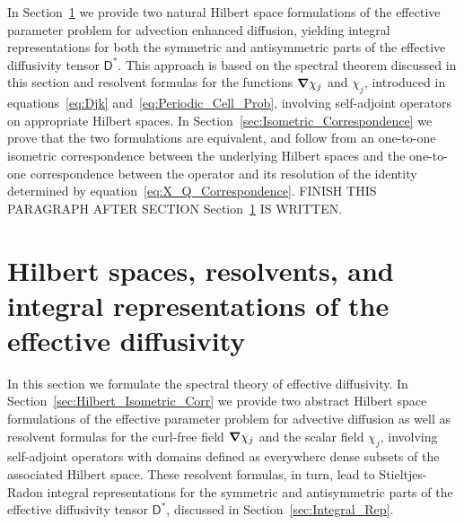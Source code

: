 \documentclass[leqno,onefignum,onetabnum]{siamltex1213}
\newcommand{\secref}[1]{Section~\ref{#1}}
\newcommand{\Dm}{\mathsf{D}}
\newcommand\bnabla{\mbox{\boldmath${\nabla}$}}
\begin{document}
In \secref{sec:Hilbert_Resolvent_Integral_Reps} we provide two natural Hilbert space
formulations of the effective parameter problem for advection enhanced
diffusion, yielding integral representations for both the symmetric and
antisymmetric parts of the effective diffusivity tensor $\Dm^*$. This
approach is based on the spectral theorem discussed in this section
and resolvent formulas for the functions $\bnabla\chi_j$ and $\chi_j$,
introduced in equations~\eqref{eq:Djk}
and~\eqref{eq:Periodic_Cell_Prob}, involving self-adjoint operators on
appropriate Hilbert spaces. In \secref{sec:Isometric_Correspondence}
we prove that the two formulations are equivalent, and follow from an
one-to-one isometric correspondence between the underlying Hilbert
spaces and the one-to-one correspondence between the operator and its
resolution of the identity determined by
equation~\eqref{eq:X_Q_Correspondence}.
FINISH THIS PARAGRAPH AFTER SECTION
\secref{sec:Hilbert_Resolvent_Integral_Reps} IS WRITTEN. 


\section{Hilbert spaces, resolvents, and integral representations of the effective diffusivity}
\label{sec:Hilbert_Resolvent_Integral_Reps} 
%
In this section we formulate the spectral theory of effective
diffusivity. In \secref{sec:Hilbert_Isometric_Corr} we provide two
abstract Hilbert space 
formulations of the effective parameter problem for advective
diffusion as well as resolvent formulas for the curl-free field
$\bnabla \chi_j$ and the scalar field $\chi_j$, involving self-adjoint
operators with domains defined as everywhere dense subsets of the
associated Hilbert space. These resolvent formulas, in turn, lead to
Stieltjes-Radon integral representations for the symmetric and
antisymmetric parts of the effective diffusivity tensor $\Dm^*$,
discussed in \secref{sec:Integral_Rep}.  
\end{document}
